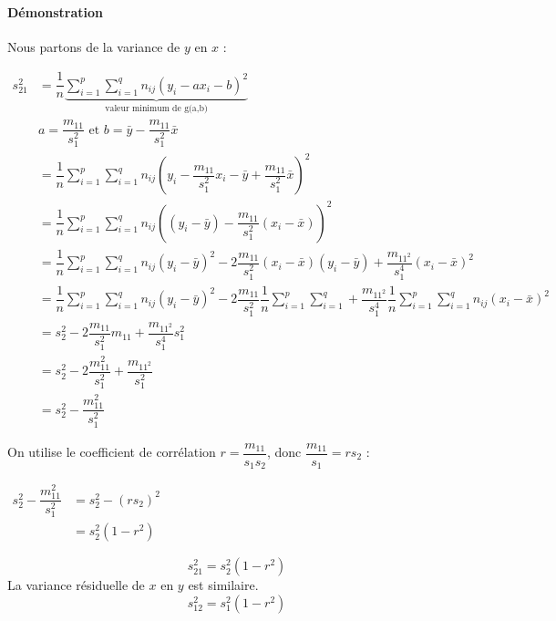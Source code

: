 \paragraph{Démonstration}
Nous partons de la variance de $y$ en $x$ :
\begin{center}
$\begin{array}{RL}
s_{21}^2 &= \dfrac{1}{n}\underbrace{\sum_{i=1}^{p}\sum_{i=1}^{q} n_{ij} \left( y_i - ax_i - b \right)^2}_{\text{valeur minimum de g(a,b)}}\\[0.5cm]
         &\boxed{a = \dfrac{m_{11}}{s_1^2}} \text{ et } \boxed{b = \bar{y} - \dfrac{m_{11}}{s_1^2}\bar{x}}\\[0.5cm]
         &= \dfrac{1}{n}\sum_{i=1}^{p}\sum_{i=1}^{q} n_{ij} \left( y_i - \dfrac{m_{11}}{s_1^2} x_i - \bar{y} + \dfrac{m_{11}}{s_1^2}\bar{x}\right)^2\\
         &= \dfrac{1}{n}\sum_{i=1}^{p}\sum_{i=1}^{q} n_{ij} \left( (y_i-\bar{y}) - \dfrac{m_{11}}{s_1^2} (x_i - \bar{x})\right)^2\\
         &= \dfrac{1}{n}\sum_{i=1}^{p}\sum_{i=1}^{q} n_{ij} (y_i-\bar{y})^2 - 2 \dfrac{m_{11}}{s_1^2} (x_i - \bar{x})(y_i-\bar{y}) + \dfrac{m_{11^2}}{s_1^4} (x_i - \bar{x})^2\\
         &= \dfrac{1}{n}\sum_{i=1}^{p}\sum_{i=1}^{q} n_{ij}(y_i-\bar{y})^2 - 2\dfrac{m_{11}}{s_1^2}\dfrac{1}{n}\sum_{i=1}^{p}\sum_{i=1}^{q} + \dfrac{m_{11^2}}{s_1^4} \dfrac{1}{n}\sum_{i=1}^{p}\sum_{i=1}^{q} n_{ij}(x_i - \bar{x})^2\\
         &= s_2^2 - 2 \dfrac{m_{11}}{s_1^2} m_{11} + \dfrac{m_{11^2}}{s_1^4} s_1^2\\
         &= s_2^2 - 2 \dfrac{m_{11}^2}{s_1^2} + \dfrac{m_{11^2}}{s_1^2}\\
         &= s_2^2 - \dfrac{m_{11}^2}{s_1^2}
\end{array}$
\end{center}
On utilise le coefficient de corrélation $r = \dfrac{m_{11}}{s_1s_2}$, donc $\dfrac{m_{11}}{s_1} = rs_2$ :
\begin{center}
$\begin{array}{RL}
s_2^2 - \dfrac{m_{11}^2}{s_1^2} &= s_2^2 - (rs_2)^2\\
                                &= s_2^2 (1-r^2)
\end{array}$
\end{center}
$$\boxed{s_{21}^2 = s_2^2 (1-r^2)}$$
La variance résiduelle de $x$ en $y$ est similaire.
$$\boxed{s_{12}^2 = s_1^2 (1-r^2)}$$
